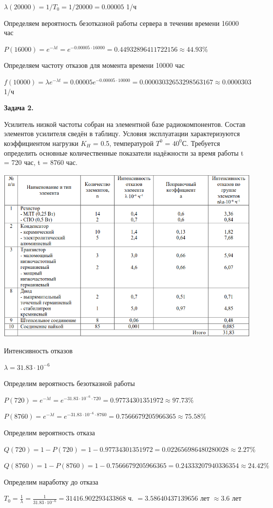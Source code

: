 $ \lambda (20000) = 1 / T_0 = 1 / 20000 = 0.00005$ 1/ч

Определяем вероятность безотказной работы сервера в течении времени 16000 час

$P(16000) = e^{-\lambda t} = e^{-0.00005 \cdot 16000} = 0.44932896411722156 \approx 44.93\%$

Определяем частоту отказов для момента времени 10000 час

$f(10000) = \lambda e^{-\lambda t} = 0.00005e^{-0.00005 \cdot 10000} = 0.00003032653298563167 \approx 0.0000303$ 1/ч

\bigskip

\textbf{Задача 2.}

Усилитель низкой частоты собран на элементной базе
радиокомпонентов. Состав элементов усилителя сведён в таблицу.
Условия эксплуатации характеризуются коэффициентом нагрузки $K_H$ =
0.5, температурой $T^0$ = $40^0$С. Требуется определить основные
количественные показатели надёжности за время работы t = 720 час, t =
8760 час.

\noindent
\begin{minipage}[H]{\linewidth}
    \includegraphics[width=\linewidth]{table}
\end{minipage}
\bigskip

Интенсивность отказов

$\lambda = 31.83 \cdot 10^{-6}$

Определим вероятность безотказной работы

$P(720) = e^{-\lambda t} = e^{-31.83 \cdot 10^{-6} \cdot 720} = 0.97734301351972 \approx 97.73\%$

$P(8760) = e^{-\lambda t} = e^{-31.83 \cdot 10^{-6} \cdot 8760} = 0.7566679205966365 \approx 75.58\%$

Определим вероятность отказа

$Q(720) = 1 - P(720) = 1 - 0.97734301351972 = 0.022656986480280028 \approx 2.27\%$

$Q(8760) = 1 - P(8760) = 1 - 0.7566679205966365 = 0.24333207940336354 \approx 24.42\%$

Определим наработку до отказа

$T_0 = \frac{1}{\lambda} = \frac{1}{31.83 \cdot 10^{-6}} = 31416.902293433868$ ч. $ = 3.58640437139656$ лет
$\approx 3.6 $ лет


